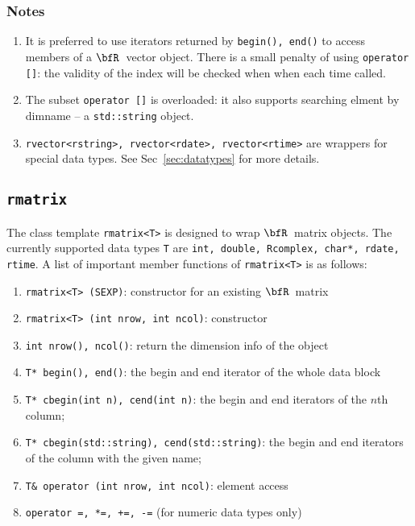 \documentclass{article}
\newcommand{\R}{$\bfR$}
\begin{document}
\subsubsection*{Notes}

\begin{enumerate}
  \item It is preferred to use iterators returned by
    \texttt{begin(), end()} to access members of a \R\ vector
    object. There is a small penalty of using
    \texttt{operator []}: the validity of the index will be
    checked when when each time called.
  \item The subset \texttt{operator []} is overloaded: it
    also supports searching elment by dimname -- a
    \texttt{std::string} object.
  \item \texttt{rvector<rstring>, rvector<rdate>,
    rvector<rtime>} are wrappers for special data types. See
    Sec~\ref{sec:datatypes} for more details.
\end{enumerate}

\subsection{\texttt{rmatrix}}

The class template \texttt{rmatrix<T>} is designed to wrap
\R\ matrix objects.  The currently supported data types
\texttt{T} are \texttt{int, double, Rcomplex, char*, rdate,
rtime}.  A list of important member functions of
\texttt{rmatrix<T>} is as follows:
\begin{enumerate}
  \item \texttt{rmatrix<T> (SEXP)}: constructor for an
    existing \R\ matrix
  \item \texttt{rmatrix<T> (int nrow, int ncol)}: constructor
  \item \texttt{int nrow(), ncol()}: return the dimension
    info of the object
  \item \texttt{T* begin(), end()}: the begin and end
    iterator of the whole data block
  \item \texttt{T* cbegin(int n), cend(int n)}: the begin and
    end iterators of the $n$th column;
  \item \texttt{T* cbegin(std::string), cend(std::string)}:
    the begin and end iterators of the column with the given
    name;
  \item \texttt{T\& operator (int nrow, int ncol)}: element access
  \item \texttt{operator =, *=, +=, -=} (for numeric data
    types only)
\end{enumerate}
\end{document}
